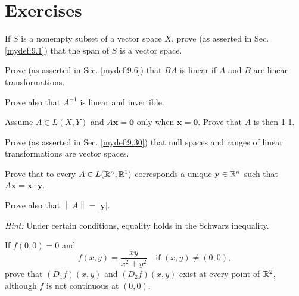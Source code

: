 
\section{Exercises}


\begin{myExercise}
    \label{ex:9.1}
    If $S$ is a nonempty subset of a vector space $X$, 
    prove (as asserted in Sec. \ref{mydef:9.1}) that
    the span of $S$ is a vector space.
\end{myExercise}


\begin{myExercise}
    \label{ex:9.2}
    Prove (as asserted in Sec. \ref{mydef:9.6}) that $BA$ is linear if $A$ and $B$ are linear transformations.
    
    Prove also that $A^{- 1}$ is linear and invertible.
\end{myExercise}


\begin{myExercise}
    \label{ex:9.3}
    Assume $A \in  L(X, Y)$ and $A\mathbf{x}= \mathbf{0}$ only when $\mathbf{x}= \mathbf{0}$. 
    Prove that $A$ is then 1-1.
\end{myExercise}


\begin{myExercise}
    \label{ex:9.4}
    Prove (as asserted in Sec. \ref{mydef:9.30}) that null spaces and ranges of linear transformations are vector spaces.
\end{myExercise}


\begin{myExercise}
    \label{ex:9.5}
    Prove that to every $A \in L({\protect\mathbb R}^n, {\protect\mathbb R}^1)$ corresponds a unique $\mathbf{y} \in {\protect\mathbb R}^n$ such that $A\mathbf{x = x \cdot y}$.
    
    Prove also that $\left\| A \right\| = \left| \mathbf{y} \right| $.

    \emph{Hint:} Under certain conditions, equality holds in the Schwarz inequality.
\end{myExercise}


\begin{myExercise}
    \label{ex:9.6}
    If $f (0, 0) = 0$ and
    \begin{equation*}
        f(x, y) = \frac{xy}{x^2 + y^2} \quad\text{if } (x, y) \neq (0, 0),
    \end{equation*}
    prove that $(D_1f)(x, y)$ and $(D_2f)(x, y)$ exist at every point of ${\protect\mathbb R}^2$, although $f$ is not continuous at $(0, 0)$.
\end{myExercise}


